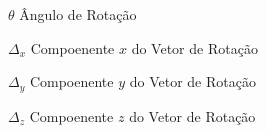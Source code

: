 
\begin{simbolos}
    \item[$ \theta $] Ângulo de Rotação
    \item[$ \Delta_x $] Compoenente $x$ do Vetor de Rotação
    \item[$ \Delta_y $] Compoenente $y$ do Vetor de Rotação
    \item[$ \Delta_z $] Compoenente $z$ do Vetor de Rotação
\end{simbolos}

